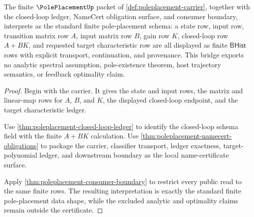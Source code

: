 \begin{theorem}
\label{thm:poleplacement-standard-finite-bridge}
The finite $\PolePlacementUp$ packet of
\autoref{def:poleplacement-carrier}, together with the closed-loop ledger,
NameCert obligation surface, and consumer boundary, interprets as the standard
finite pole-placement schema: a state row, input row, transition matrix row
$A$, input matrix row $B$, gain row $K$, closed-loop row $A+BK$, and requested
target characteristic row are all displayed as finite $\mathsf{BHist}$ rows
with explicit transport, continuation, and provenance. This bridge exports no
analytic spectral assumption, pole-existence theorem, host trajectory
semantics, or feedback optimality claim.
\end{theorem}
\begin{proof}
Begin with the carrier. It gives the state and input rows, the matrix and
linear-map rows for $A$, $B$, and $K$, the displayed closed-loop endpoint, and
the target characteristic ledger.

Use \autoref{thm:poleplacement-closed-loop-ledger} to identify the closed-loop
schema field with the finite $A+BK$ calculation. Use
\autoref{thm:poleplacement-namecert-obligations} to package the carrier,
classifier transport, ledger exactness, target-polynomial ledger, and
downstream boundary as the local name-certificate surface.

Apply \autoref{thm:poleplacement-consumer-boundary} to restrict every public
read to the same finite rows. The resulting interpretation is exactly the
standard finite pole-placement data shape, while the excluded analytic and
optimality claims remain outside the certificate.
\end{proof}

